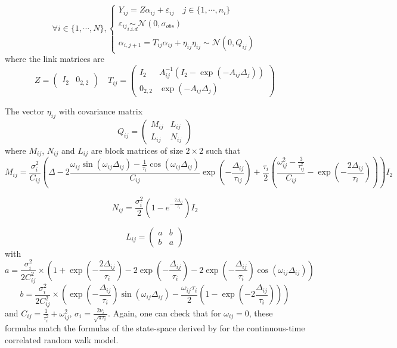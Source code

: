 \documentclass[11pt]{article}
\newcommand {\1}{\mathbb{1}}
\begin{document}
\begin{equation}
	\forall i \in \{1,\cdots,N\}, \left\{
	\begin{array}{l}
		Y_{ij}=Z\alpha_{ij}+\varepsilon_{ij} \quad j \in \{1,\cdots,n_i\}\\
		\varepsilon_{ij} \underset{i.i.d}{\sim} \mathcal{N}(0,\sigma_{obs}) \\
		\alpha_{i,j+1}=T_{ij} \alpha_{ij} + \eta_{ij}
		\eta_{ij} \sim \mathcal{N}(0,Q_{ij})
	\end{array}
	\right.
	\label{eq: RACVM state space}
\end{equation}
where the link matrices are 
\[Z=\begin{pmatrix} I_2 & 0_{2,2}\end{pmatrix} \quad  T_{ij}=\begin{pmatrix} I_2 & A_{ij}^{-1}(I_2-\exp(-A_{ij} \Delta_j)) \\ 0_{2,2} & \exp(-A_{ij} \Delta_j) \end{pmatrix}\]

The vector $\eta_{ij}$ with covariance matrix 
\begin{equation}
	Q_{ij}=\begin{pmatrix}
		M_{ij} & L_{ij} \\
		L_{ij} & N_{ij}
	\end{pmatrix}
	\label{eq: state space covariance}
\end{equation}
where $M_{ij}$, $N_{ij}$ and $L_{ij}$ are block matrices of size $2 \times 2$ such that 
\[M_{ij}=\frac{\sigma_i^2}{C_{ij}}\left( \Delta-2 \frac{\omega_{ij} \sin(\omega_{ij} \Delta_{ij})-\frac{1}{\tau_{i}} \cos(\omega_{ij} \Delta_{ij})}{C_{ij} } \exp\left( -\frac{\Delta_{ij}}{\tau_{ij}} \right) +\frac{\tau_{i}}{2} \left( \frac{\omega_{ij}^2-\frac{3}{\tau_{ij}^2}}{C_{ij}}-\exp\left( -\frac{2\Delta_{ij}}{\tau_i}\right)\right) \right)I_2\]

\[N_{ij}=\frac{\sigma_i^2}{2}\left(1-e^{-\frac{2 \Delta_{ij}}{\tau_{i}}}\right)I_2\]

\[L_{ij}=\begin{pmatrix} a & b \\
	b & a\end{pmatrix}\]
with
\[a=\frac{\sigma_i^2}{2 C_{ij}^2 } \times \left( 1+\exp\left( -\frac{2\Delta_{ij}}{\tau_{i}}\right)-2\exp\left( -\frac{\Delta_{ij}}{\tau_{i}}\right)-2\exp\left( -\frac{\Delta_{ij}}{\tau_{i}}\right) \cos(\omega_{ij}\Delta_{ij})\right)\]
\[b=\frac{\sigma_{i}^2}{2 C_{ij}^2} \times\left( \exp\left( -\frac{\Delta_{ij}}{\tau_{i}}\right) \sin(\omega_{ij} \Delta_{ij})-\frac{\omega_{ij} \tau_{i}}{2} \left(1-\exp\left( -2 \frac{\Delta_{ij}}{\tau_{i}}\right) \right)\right)\]
and $C_{ij}=\frac{1}{\tau_i^2}+\omega_{ij}^2$, $\sigma_{i}=\frac{2\nu_i}{\sqrt{\pi \tau_i}}$.
Again, one can check that for $\omega_{ij}=0$, these formulas match the formulas of the state-space derived by \cite{johnson_continuoustime_2008} for the continuous-time correlated random walk model.\\
\end{document}
